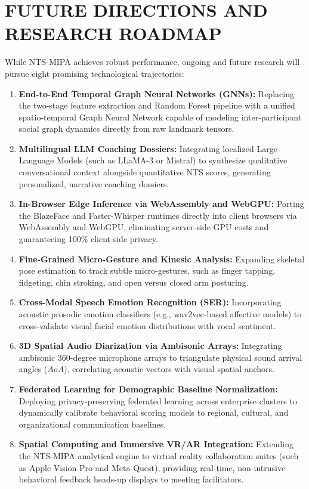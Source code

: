\documentclass[12pt,a4paper,oneside]{report}
\begin{document}
\section{FUTURE DIRECTIONS AND RESEARCH ROADMAP}
While NTS-MIPA achieves robust performance, ongoing and future research will pursue eight promising technological trajectories:
\begin{enumerate}
    \item \textbf{End-to-End Temporal Graph Neural Networks (GNNs):} Replacing the two-stage feature extraction and Random Forest pipeline with a unified spatio-temporal Graph Neural Network capable of modeling inter-participant social graph dynamics directly from raw landmark tensors.
    \item \textbf{Multilingual LLM Coaching Dossiers:} Integrating localized Large Language Models (such as LLaMA-3 or Mistral) to synthesize qualitative conversational context alongside quantitative NTS scores, generating personalized, narrative coaching dossiers.
    \item \textbf{In-Browser Edge Inference via WebAssembly and WebGPU:} Porting the BlazeFace and Faster-Whisper runtimes directly into client browsers via WebAssembly and WebGPU, eliminating server-side GPU costs and guaranteeing 100\% client-side privacy.
    \item \textbf{Fine-Grained Micro-Gesture and Kinesic Analysis:} Expanding skeletal pose estimation to track subtle micro-gestures, such as finger tapping, fidgeting, chin stroking, and open versus closed arm posturing.
    \item \textbf{Cross-Modal Speech Emotion Recognition (SER):} Incorporating acoustic prosodic emotion classifiers (e.g., wav2vec-based affective models) to cross-validate visual facial emotion distributions with vocal sentiment.
    \item \textbf{3D Spatial Audio Diarization via Ambisonic Arrays:} Integrating ambisonic 360-degree microphone arrays to triangulate physical sound arrival angles ($AoA$), correlating acoustic vectors with visual spatial anchors.
    \item \textbf{Federated Learning for Demographic Baseline Normalization:} Deploying privacy-preserving federated learning across enterprise clusters to dynamically calibrate behavioral scoring models to regional, cultural, and organizational communication baselines.
    \item \textbf{Spatial Computing and Immersive VR/AR Integration:} Extending the NTS-MIPA analytical engine to virtual reality collaboration suites (such as Apple Vision Pro and Meta Quest), providing real-time, non-intrusive behavioral feedback heads-up displays to meeting facilitators.
\end{enumerate}
\end{document}
